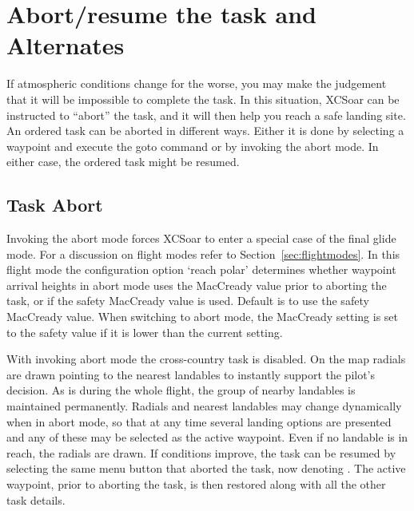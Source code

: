 
\section{Abort/resume the task and Alternates}

If atmospheric conditions change for the worse, you may make the
judgement that it will be impossible to complete the task.  In this
situation, XCSoar can be instructed to ``abort'' the task, and it will
then help you reach a safe landing site. An ordered task can be aborted in 
different ways. Either it is done by selecting a waypoint and execute the goto 
command or by invoking the abort mode. In either case, the ordered task might be resumed.

\subsection*{Task Abort}\label{sec:taskabort}
Invoking the abort mode forces XCSoar to enter a special case of the final glide mode.  For a discussion on 
flight modes refer to Section~\ref{sec:flightmodes}. In this flight mode
the configuration option `reach polar' determines whether
waypoint arrival heights in abort mode uses the MacCready value prior
to aborting the task, or if the safety MacCready value is used. 
Default is to use the safety MacCready value.  When switching to
abort mode, the MacCready setting is set to the safety value 
if it is lower than the current setting.

With invoking abort mode the cross-country task is disabled. On the map radials 
are drawn pointing to the nearest landables to instantly 
support the pilot's decision. As is during the whole flight, the group of nearby 
landables is maintained permanently. Radials and nearest landables may change 
dynamically when in abort mode, so that at any time several landing options are 
presented and any of these may be selected as the active waypoint. Even if no 
landable is in reach, the radials are drawn.
If conditions improve, the task can be resumed by selecting the same
menu button that aborted the task, now denoting . The active 
waypoint, prior to aborting the task, is then restored along with all the other 
task details.

